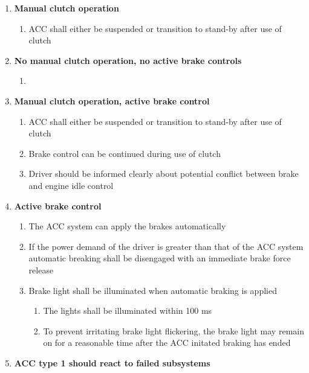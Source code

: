 \begin{enumerate}
    \item{\bf Manual clutch operation}
    \begin{enumerate}[label*=\arabic*]
        \item{ACC shall either be suspended or transition to stand-by after use of clutch}
    \end{enumerate}
    \item{\bf No manual clutch operation, no active brake controls}
    \begin{enumerate}[label*=\arabic*]
        \item{}
    \end{enumerate}
    \item{\bf Manual clutch operation, active brake control}
    \begin{enumerate}[label*=\arabic*]
        \item{ACC shall either be suspended or transition to stand-by after use of clutch}
        \item{Brake control can be continued during use of clutch}
        \item{Driver should be informed clearly about potential conflict between brake and engine idle control}
    \end{enumerate}
    \item{\bf Active brake control}
    \begin{enumerate}[label*=\arabic*]
        \item {The ACC system can apply the brakes automatically}
        \item {If the power demand of the driver is greater than that of the ACC system automatic breaking shall be disengaged with an immediate brake force release}
        \item {Brake light shall be illuminated when automatic braking is applied}
        \begin{enumerate}[label*=\arabic*]
            \item {The lights shall be illuminated within 100 ms}
            \item {To prevent irritating brake light flickering, the brake light may remain on for a reasonable time after the ACC initated braking has ended}
        \end{enumerate}
    \end{enumerate}   
    \item{\bf ACC type 1 should react to failed subsystems}
    \begin{enumerate}[label*=\arabic*]

\end{enumerate}
\end{enumerate}
